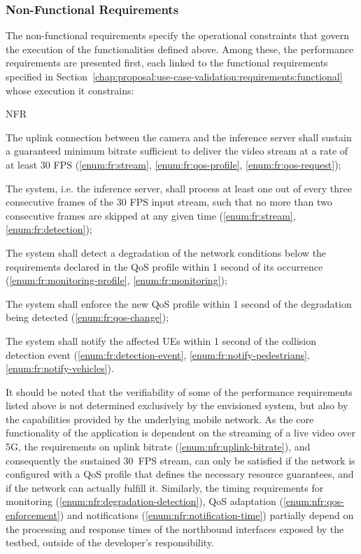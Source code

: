 \subsubsection{Non-Functional Requirements}
\label{chap:proposal:use-case-validation:requirements:nonfunctional}

The non-functional requirements specify the operational constraints that govern the execution of the functionalities defined above. Among these, the performance requirements are presented first, each linked to the functional requirements specified in Section~\ref{chap:proposal:use-case-validation:requirements:functional} whose execution it constrains:

\begin{custenumerate}{NFR}
    \item \label{enum:nfr:uplink-bitrate} The uplink connection between the camera and the inference server shall sustain a guaranteed minimum bitrate sufficient to deliver the video stream at a rate of at least 30 \acs{FPS} (\ref{enum:fr:stream}, \ref{enum:fr:qos-profile}, \ref{enum:fr:qos-request});
    \item \label{enum:nfr:frame-processing} The system, i.e. the inference server, shall process at least one out of every three consecutive frames of the 30 \acs{FPS} input stream, such that no more than two consecutive frames are skipped at any given time (\ref{enum:fr:stream}, \ref{enum:fr:detection});
    \item \label{enum:nfr:degradation-detection} The system shall detect a degradation of the network conditions below the requirements declared in the \acs{QoS} profile within 1 second of its occurrence (\ref{enum:fr:monitoring-profile}, \ref{enum:fr:monitoring});
    \item \label{enum:nfr:qos-enforcement} The system shall enforce the new \acs{QoS} profile within 1 second of the degradation being detected (\ref{enum:fr:qos-change});
    \item \label{enum:nfr:notification-time} The system shall notify the affected \acsp{UE} within 1 second of the collision detection event (\ref{enum:fr:detection-event}, \ref{enum:fr:notify-pedestrians}, \ref{enum:fr:notify-vehicles}).
\end{custenumerate}

It should be noted that the verifiability of some of the performance requirements listed above is not determined exclusively by the envisioned system, but also by the capabilities provided by the underlying mobile network. As the core functionality of the application is dependent on the streaming of a live video over \acs{5G}, the requirements on uplink bitrate (\ref{enum:nfr:uplink-bitrate}), and consequently the sustained 30~\acs{FPS} stream, can only be satisfied if the network is configured with a \acs{QoS} profile that defines the necessary resource guarantees, and if the network can actually fulfill it. Similarly, the timing requirements for monitoring (\ref{enum:nfr:degradation-detection}), \acs{QoS} adaptation (\ref{enum:nfr:qos-enforcement}) and notifications (\ref{enum:nfr:notification-time}) partially depend on the processing and response times of the northbound interfaces exposed by the testbed, outside of the developer's responsibility.

